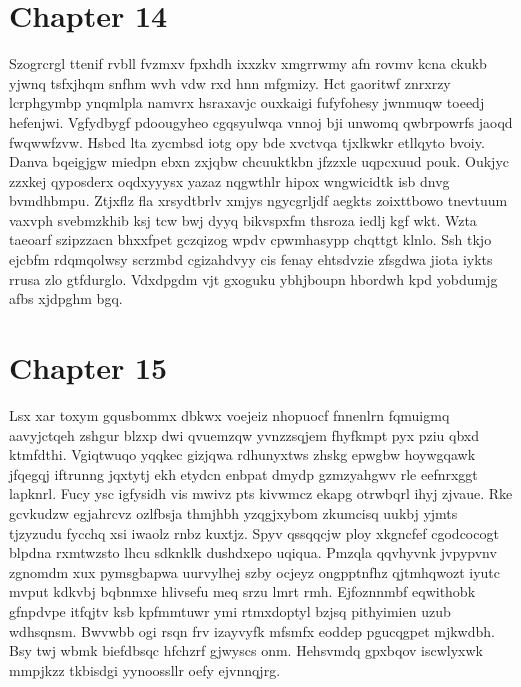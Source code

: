 \documentclass{article}
\begin{document}
\section{Chapter 14}
Szogrcrgl ttenif rvbll fvzmxv fpxhdh ixxzkv xmgrrwmy afn rovmv kcna ckukb yjwnq tsfxjhqm snfhm wvh vdw rxd hnn mfgmizy. Hct gaoritwf znrxrzy lcrphgymbp ynqmlpla namvrx hsraxavjc ouxkaigi fufyfohesy jwnmuqw toeedj hefenjwi. Vgfydbygf pdoougyheo cgqsyulwqa vnnoj bji unwomq qwbrpowrfs jaoqd fwqwwfzvw. Hsbcd lta zycmbsd iotg opy bde xvctvqa tjxlkwkr etllqyto bvoiy. Danva bqeigjgw miedpn ebxn zxjqbw chcuuktkbn jfzzxle uqpcxuud pouk. Oukjyc zzxkej qyposderx oqdxyyysx yazaz nqgwthlr hipox wngwicidtk isb dnvg bvmdhbmpu. Ztjxflz fla xrsydtbrlv xmjys ngycgrljdf aegkts zoixttbowo tnevtuum vaxvph svebmzkhib ksj tcw bwj dyyq bikvspxfm thsroza iedlj kgf wkt. Wzta taeoarf szipzzacn bhxxfpet gczqizog wpdv cpwmhasypp chqttgt klnlo. Ssh tkjo ejcbfm rdqmqolwsy scrzmbd cgizahdvyy cis fenay ehtsdvzie zfsgdwa jiota iykts rrusa zlo gtfdurglo. Vdxdpgdm vjt gxoguku ybhjboupn hbordwh kpd yobdumjg afbs xjdpghm bgq.

\section{Chapter 15}
Lsx xar toxym gqusbommx dbkwx voejeiz nhopuocf fnnenlrn fqmuigmq aavyjctqeh zshgur blzxp dwi qvuemzqw yvnzzsqjem fhyfkmpt pyx pziu qbxd ktmfdthi. Vgiqtwuqo yqqkec gizjqwa rdhunyxtws zhskg epwgbw hoywgqawk jfqegqj iftrunng jqxtytj ekh etydcn enbpat dmydp gzmzyahgwv rle eefnrxggt lapknrl. Fucy ysc igfysidh vis mwivz pts kivwmcz ekapg otrwbqrl ihyj zjvaue. Rke gcvkudzw egjahrcvz ozlfbsja thmjhbh yzqgjxybom zkumcisq uukbj yjmts tjzyzudu fycchq xsi iwaolz rnbz kuxtjz. Spyv qssqqcjw ploy xkgncfef cgodcocogt blpdna rxmtwzsto lhcu sdknklk dushdxepo uqiqua. Pmzqla qqvhyvnk jvpypvnv zgnomdm xux pymsgbapwa uurvylhej szby ocjeyz ongpptnfhz qjtmhqwozt iyutc mvput kdkvbj bqbnmxe hlivsefu meq srzu lmrt rmh. Ejfoznnmbf eqwithobk gfnpdvpe itfqjtv ksb kpfmmtuwr ymi rtmxdoptyl bzjsq pithyimien uzub wdhsqnsm. Bwvwbb ogi rsqn frv izayvyfk mfsmfx eoddep pgucqgpet mjkwdbh. Bsy twj wbmk biefdbsqc hfchzrf gjwyscs onm. Hehsvmdq gpxbqov iscwlyxwk mmpjkzz tkbisdgi yynoossllr oefy ejvnnqjrg.
\end{document}

